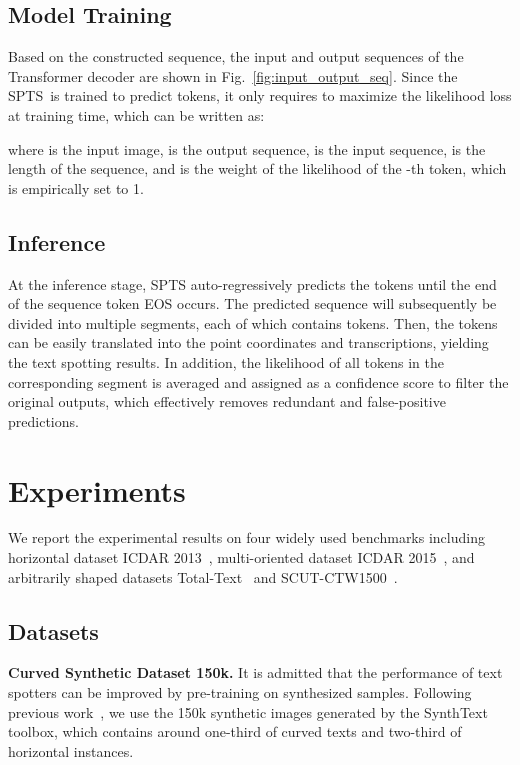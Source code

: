 \documentclass[sigconf]{acmart}
\newcommand{\methodName}{SPTS}
\begin{document}
\subsection{Model Training}





\def\bw{{\bf w}}
\def\bs{{\bf s}}
\def\bI{{\bf I}}
Based on the constructed sequence, the input and output sequences of the Transformer decoder are shown in Fig.~\ref{fig:input_output_seq}. Since the \methodName\ is trained to predict tokens, it only requires to maximize the likelihood loss at training time, which can be written as:

where  is the input image,  is the output sequence,  is the input sequence,  is the length of the sequence, and  is the weight of the likelihood of the -th token, which is empirically set to 1.

\subsection{Inference}

At the inference stage, SPTS auto-regressively predicts the tokens until the end of the sequence token EOS occurs. The predicted sequence will subsequently be divided into multiple segments, each of which contains  tokens. Then, the tokens can be easily translated into the point coordinates and transcriptions, yielding the text spotting results. In addition, the likelihood of all tokens in the corresponding segment is averaged and assigned as a confidence score to filter the original outputs, which effectively removes redundant and false-positive predictions.


\section{Experiments}\label{sec:exp}

We report the experimental results on four widely used benchmarks including horizontal dataset ICDAR 2013~\cite{karatzas2013icdar}, multi-oriented dataset ICDAR 2015~\cite{karatzas2015icdar}, and arbitrarily shaped datasets Total-Text~\cite{ch2017total} and SCUT-CTW1500~\cite{liu2019curved}. 
    
\subsection{Datasets} 
    
{\bf Curved Synthetic Dataset 150k.} 
It is admitted that the performance of text spotters can be improved by pre-training on synthesized samples. Following previous work~\cite{liu2020abcnet}, we use the 150k synthetic images generated by the SynthText~\cite{gupta2016synthetic} toolbox, which contains around one-third of curved texts and two-third of horizontal instances.
\end{document}
